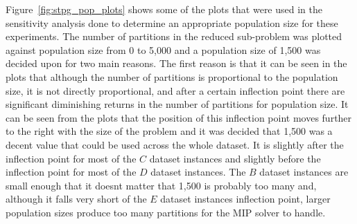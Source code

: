 \documentclass[journal]{IEEEtran}
\begin{document}
Figure~\ref{fig:stpg_pop_plots} shows some of the plots that were used in the sensitivity analysis done to determine an appropriate population size for these experiments. The number of partitions in the reduced sub-problem was plotted against population size from 0 to 5,000 and a population size of 1,500 was decided upon for two main reasons. The first reason is that it can be seen in the plots that although the number of partitions is proportional to the population size, it is not directly proportional, and after a certain inflection point there are significant diminishing returns in the number of partitions for population size. It can be seen from the plots that the position of this inflection point moves further to the right with the size of the problem and it was decided that 1,500 was a decent value that could be used across the whole dataset. It is slightly after the inflection point for most of the \(C\) dataset instances and slightly before the inflection point for most of the \(D\) dataset instances. The \(B\) dataset instances are small enough that it doesnt matter that 1,500 is probably too many and, although it falls very short of the \(E\) dataset instances inflection point, larger population sizes produce too many partitions for the MIP solver to handle.
\end{document}
